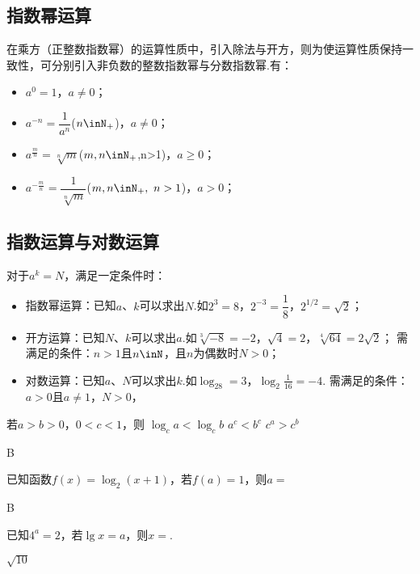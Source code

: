   \subsection{指数幂运算}
    在乘方（正整数指数幂）的运算性质中，引入除法与开方，则为使运算性质保持一致性，可分别引入非负数的整数指数幂与分数指数幂.有：
    \begin{itemize}
      \item $a^0=1$，$a\neq 0$；
      \item $a^{-n}=\dfrac1{a^n}$($n\inN_+$)，$a\neq 0$；
      \item $a^{\frac{m}{n}}=\sqrt[n]m$($m,n\inN_+$,n>1)，$a\geqslant 0$；
      \item $a^{-\frac{m}{n}}=\dfrac{1}{\sqrt[n]m}$($m,n\inN_+,~n>1$)，$a>0$；
    \end{itemize}
  \subsection{指数运算与对数运算}
    对于$a^k=N$，满足一定条件时：
    \begin{itemize}
      \item {\FDef 指数幂运算}：已知$a$、$k$可以求出$N$.如$2^3=8$，$2^{-3}=\dfrac18$，$2^{1/2}=\sqrt2$；
      \item {\FDef 开方运算}：已知$N$、$k$可以求出$a$.如$\sqrt[3]{-8}=-2$，$\sqrt4=2$，$\sqrt[4]{64}=2\sqrt2$；
        需满足的条件：$n>1$且$n\inN$，且$n$为偶数时$N>0$；
      \item {\FDef 对数运算}：已知$a$、$N$可以求出$k$.如$\log_28=3$，$\log_2{\frac1{16}}=-4$.
        需满足的条件：$a>0$且$a\neq 1$，$N>0$，
    \end{itemize}
    \begin{exercise}
      \item %
        若$a>b>0$，$0<c<1$，则\xz
         {$\log_ca<\log_cb$}
         {$a^c<b^c$}
         {$c^a>c^b$}
        \begin{answer}
          B
        \end{answer}
      \item %
        已知函数$f(x)=\log_2(x+1)$，若$f(a)=1$，则$a=$\xz
        \begin{answer}
          B
        \end{answer}
      \item %
        已知$4^a=2$，若$\lg x=a$，则$x=$\tk.
        \begin{answer}
          $\sqrt{10}$
        \end{answer}
    \end{exercise}
